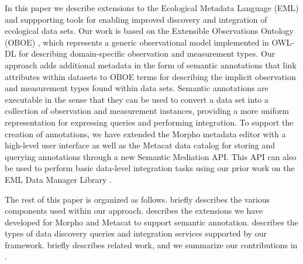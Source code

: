 In this paper we describe extensions to the Ecological Metadata
Language (EML) \cite{} and suppporting tools for enabling improved
discovery and integration of ecological data sets. Our work is based
on the Extensible Observations Ontology (OBOE) \cite{}, which
represents a generic observational model implemented in OWL-DL for
describing domain-specific observation and measurement types. Our
approach adds additional metadata in the form of semantic annotations
that link attributes within datasets to OBOE terms for describing the
implicit observation and measurement types found within data
sets. Semantic annotations are executable in the sense that they can
be used to convert a data set into a collection of observation and
measurement instances, providing a more uniform representation for
expressing queries and performing integration.  To support the
creation of annotations, we have extended the Morpho metadata editor
with a high-level user interface as well as the Metacat data catalog
for storing and querying annotations through a new Semantic Mediation
API. This API can also be used to perform basic data-level integration
tasks using our prior work on the EML Data Manager Library \cite{}. 

The rest of this paper is organized as follows. 
briefly describes the various components used within our
approach.  describes the extensions we have
developed for Morpho and Metacat to support semantic
annotation.  describes the types of data
discovery queries and integration services supported by our
framework.  briefly describes related work, and we
summarize our contributions in . 






